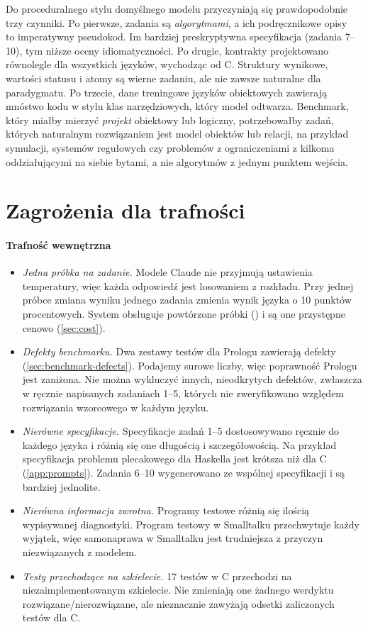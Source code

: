 Do proceduralnego stylu domyślnego modelu przyczyniają się prawdopodobnie trzy czynniki.
Po pierwsze, zadania są \emph{algorytmami}, a ich podręcznikowe opisy~\cite{cormen2009clrs} to
imperatywny pseudokod. Im bardziej preskryptywna specyfikacja (zadania 7--10), tym niższe oceny
idiomatyczności. Po drugie, kontrakty projektowano równolegle dla wszystkich języków, wychodząc od C.
Struktury wynikowe, wartości statusu i atomy  są wierne zadaniu, ale nie zawsze naturalne
dla paradygmatu. Po trzecie, dane treningowe języków obiektowych zawierają mnóstwo kodu w stylu klas
narzędziowych, który model odtwarza. Benchmark, który miałby mierzyć \emph{projekt} obiektowy lub
logiczny, potrzebowałby zadań, których naturalnym rozwiązaniem jest model obiektów lub relacji,
na przykład symulacji, systemów regułowych czy problemów z ograniczeniami z kilkoma oddziałującymi
na siebie bytami, a nie algorytmów z jednym punktem wejścia.

\section{Zagrożenia dla trafności}
\label{sec:threats}

\paragraph{Trafność wewnętrzna}
\begin{itemize}
  \item \emph{Jedna próbka na zadanie.} Modele Claude nie przyjmują ustawienia temperatury, więc
    każda odpowiedź jest losowaniem z rozkładu. Przy jednej próbce zmiana wyniku jednego zadania
    zmienia wynik języka o 10 punktów procentowych. System obsługuje powtórzone próbki
    () i są one przystępne cenowo (\cref{sec:cost}).
  \item \emph{Defekty benchmarku.} Dwa zestawy testów dla Prologu zawierają defekty
    (\cref{sec:benchmark-defects}). Podajemy surowe liczby, więc poprawność Prologu jest zaniżona.
    Nie można wykluczyć innych, nieodkrytych defektów, zwłaszcza w ręcznie napisanych zadaniach
    1--5, których nie zweryfikowano względem rozwiązania wzorcowego w każdym języku.
  \item \emph{Nierówne specyfikacje.} Specyfikacje zadań 1--5 dostosowywano ręcznie do każdego
    języka i różnią się one długością i szczegółowością. Na przykład specyfikacja problemu
    plecakowego dla Haskella jest krótsza niż dla C (\cref{app:prompts}). Zadania 6--10
    wygenerowano ze wspólnej specyfikacji i są bardziej jednolite.
  \item \emph{Nierówna informacja zwrotna.} Programy testowe różnią się ilością wypisywanej
    diagnostyki. Program testowy w Smalltalku przechwytuje każdy wyjątek, więc samonaprawa
    w Smalltalku jest trudniejsza z przyczyn niezwiązanych z modelem.
  \item \emph{Testy przechodzące na szkielecie.} 17 testów w C przechodzi na niezaimplementowanym
    szkielecie. Nie zmieniają one żadnego werdyktu rozwiązane/nierozwiązane, ale nieznacznie
    zawyżają odsetki zaliczonych testów dla C.
\end{itemize}


